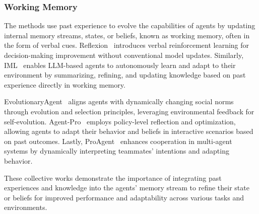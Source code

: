\documentclass[sn-basic, Numbered]{sn-jnl}%
\theoremstyle{thmstyleone}%
\theoremstyle{thmstyletwo}%
\theoremstyle{thmstylethree}%
\begin{document}
\subsubsection{Working Memory} The methods use past experience to evolve the capabilities of agents by updating internal memory streams, states, or beliefs, known as working memory, often in the form of verbal cues. Reflexion~\cite{shinn2023reflexion} introduces verbal reinforcement learning for decision-making improvement without conventional model updates. Similarly, IML~\cite{wang2024memory} enables LLM-based agents to autonomously learn and adapt to their environment by summarizing, refining, and updating knowledge based on past experience directly in working memory. 

EvolutionaryAgent~\cite{li2024agent} aligns agents with dynamically changing social norms through evolution and selection principles, leveraging environmental feedback for self-evolution. Agent-Pro~\cite{zhang2024agent} employs policy-level reflection and optimization, allowing agents to adapt their behavior and beliefs in interactive scenarios based on past outcomes. Lastly, ProAgent~\cite{zhang2024proagent} enhances cooperation in multi-agent systems by dynamically interpreting teammates' intentions and adapting behavior. 

These collective works demonstrate the importance of integrating past experiences and knowledge into the agents' memory stream to refine their state or beliefs for improved performance and adaptability across various tasks and environments.
\end{document}
